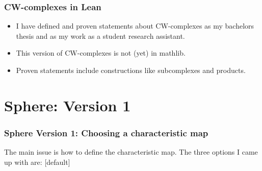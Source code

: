 \documentclass{beamer}
\begin{document}
\begin{frame}
  \frametitle{CW-complexes in Lean}
  \begin{itemize}
    \item I have defined and proven statements about CW-complexes as my bachelors thesis and as my work as a student research assistant.
    \item This version of CW-complexes is not (yet) in mathlib. 
    \item Proven statements include constructions like subcomplexes and products.
  \end{itemize}
\end{frame}

\section{Sphere: Version 1}

\begin{frame}
  \frametitle{Sphere Version 1: Choosing a characteristic map}
  The main issue is how to define the characteristic map. 
  The three options I came up with are: 
  [default]
  \begin{itemize}
    \begin{itemize}
    \end{itemize}
    \begin{itemize}
    \end{itemize}
    \begin{itemize}
    \end{itemize}
  \end{itemize}
  \end{frame}
\end{document}

